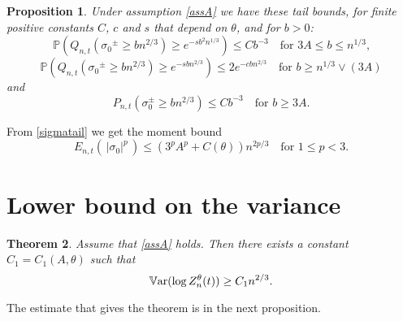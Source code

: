 \documentclass[11pt]{amsart}
\newtheorem{theorem}{\sc Theorem}[section]
\newtheorem{proposition}[theorem]{\sc Proposition}
\numberwithin{equation}{section}
\theoremstyle{remark}
\providecommand{\abs}[1]{\vert#1\vert}
\begin{document}
 \begin{proposition}
Under assumption \eqref{assA} we have these tail bounds, for finite positive  constants 
$C$, $c$ and  $s$ that depend on ${\theta}$, and for $b>0$:    
\begin{equation}  \label{sigmatail1}
{\mathbb{P}}(Q_{n,t}({\sigma_0}^\pm \ge b n^{2/3})\ge  e^{-s b^2 n^{1/3}})\le C b^{-3} 
\quad\text{for $3A\le b\le n^{1/3}$,}
\end{equation}
\begin{equation}  \label{sigmatail2}
{\mathbb{P}}(Q_{n,t}({\sigma_0}^\pm \ge b n^{2/3})\ge  e^{-s b n^{2/3}})\le 2e^{-cbn^{2/3}}
\quad\text{for $b\ge n^{1/3}\vee(3A)$}
\end{equation}
and 
\begin{equation} 
\label{sigmatail}
P_{n,t}(\sigma_0^\pm \ge b n^{2/3})\le C b^{-3}\quad\text{for $b\ge 3A$}.
\end{equation} 
\label{sigmaprop}\end{proposition} 
From \eqref{sigmatail} we get the moment bound 
\begin{equation}   E_{n,t}(\,\abs{\sigma_0}^p\,) \le (3^pA^p+C({\theta}))n^{2p/3}\quad
\text{for $1\le p<3$.}  
\label{sigmapmom}\end{equation}

\section{Lower bound on the variance}
\begin{theorem}\label{LBthm}
Assume that   \eqref{assA} holds. Then there exists a constant 
$C_1=C_1(A,{\theta})$ such that
\begin{equation} 
{{\rm\mathbb{V}ar}} (\log Z_n^{\theta}(t))\ge C_1 n^{2/3}.
\end{equation}
\end{theorem}
The   estimate that gives the theorem is in the next proposition.  
\end{document}
